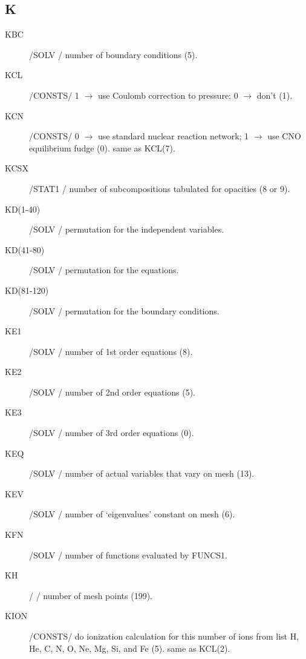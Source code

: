 \documentclass{article}
\begin{document}
\subsection*{K}
\begin{description}
	\item[KBC]		    /SOLV  / number of boundary conditions (5).

	\item[KCL]		    /CONSTS/ 1 $\to$ use Coulomb correction to pressure; 0 $\to$ don't  (1).

	\item[KCN]		    /CONSTS/ 0 $\to$ use standard nuclear reaction network; 1 $\to$ use CNO equilibrium fudge (0).  same as KCL(7).

	\item[KCSX]		/STAT1 / number of subcompositions tabulated for opacities (8 or 9).

    \item[KD(1-40)] 	/SOLV  / permutation for the independent variables.

    \item[KD(41-80)] 	/SOLV  / permutation for the equations.

    \item[KD(81-120)] 	/SOLV  / permutation for the boundary conditions.

	\item[KE1]		    /SOLV  / number of 1st order equations (8).

	\item[KE2]		    /SOLV  / number of 2nd order equations (5).

	\item[KE3]		    /SOLV  / number of 3rd order equations (0).

	\item[KEQ]		    /SOLV  / number of actual variables that vary on mesh (13).

	\item[KEV]		    /SOLV  / number of `eigenvalues' constant on mesh (6).

	\item[KFN]		    /SOLV  / number of functions evaluated by FUNCS1.

	\item[KH]		    /      / number of mesh points (199).

	\item[KION]		/CONSTS/ do ionization calculation for this number of ions   
					from list H, He, C, N, O, Ne,  Mg, Si, and Fe (5).   same as KCL(2).
	

\end{description}
\end{document}

